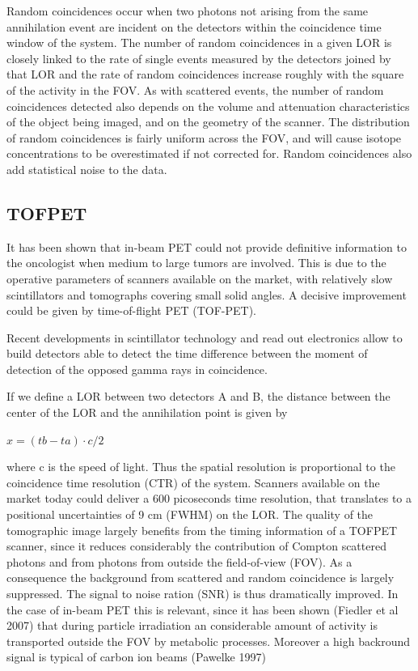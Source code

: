 Random coincidences occur when two photons not arising from the same annihilation event are incident on the detectors within the coincidence time window of the system. The number of random coincidences in a given \ac{LOR} is closely linked to the rate of single events measured by the detectors joined by that \ac{LOR} and the rate of random coincidences increase roughly with the square of the activity in the \ac{FOV}. As with scattered events, the number of random coincidences detected also depends on the volume and attenuation characteristics of the object being imaged, and on the geometry of the scanner. The distribution of random coincidences is fairly uniform across the \ac{FOV}, and will cause isotope concentrations to be overestimated if not corrected for. Random coincidences also add statistical noise to the data.


\subsection{TOFPET}

It has been shown that in-beam PET could not provide definitive information to the oncologist when medium to large tumors are involved\cite{Fiedler2006}. This is due to the operative parameters of scanners available on the market, with relatively slow scintillators and tomographs covering small solid angles. A decisive improvement could be given by time-of-flight PET (TOF-PET).

Recent developments in scintillator technology and read out electronics allow to build detectors able to detect the time difference between the moment of detection of the opposed gamma rays in coincidence. 

If we define a LOR between two detectors A and B, the distance between the center of the LOR and the annihilation point is given by

$x = (tb − ta ) · c/2$

where c is the speed of light.
Thus the spatial resolution is proportional to the coincidence time resolution (CTR) of the system.
Scanners available on the market today could deliver a 600 picoseconds time resolution, that translates to a positional uncertainties of 9 cm (FWHM) on the LOR.
The quality of the tomographic image largely benefits from the timing information of a TOFPET scanner, since it reduces considerably  the contribution of Compton scattered photons and from photons from outside the field-of-view (FOV). As a consequence the background from scattered and random coincidence is largely suppressed.
The signal to noise ration (SNR) is thus dramatically improved.
In the case of in-beam PET this is relevant, since it has been shown (Fiedler et al 2007) that during particle irradiation an considerable amount of activity is transported outside the FOV by metabolic processes. Moreover a high backround signal is typical of carbon ion beams (Pawelke 1997)

